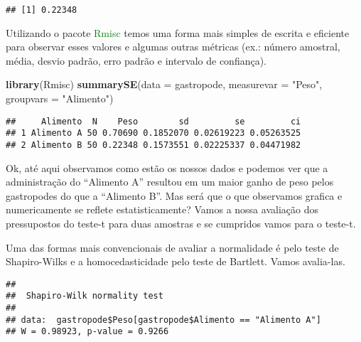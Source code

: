 \documentclass[titlepage, oneside, openany, a4paper]{book}
\newenvironment{Shaded}{\begin{snugshade}}{\end{snugshade}}
\newcommand{\DataTypeTok}[1]{\textcolor[rgb]{0.13,0.29,0.53}{#1}}
\newcommand{\KeywordTok}[1]{\textcolor[rgb]{0.13,0.29,0.53}{\textbf{#1}}}
\newcommand{\NormalTok}[1]{#1}
\newcommand{\OperatorTok}[1]{\textcolor[rgb]{0.81,0.36,0.00}{\textbf{#1}}}
\newcommand{\StringTok}[1]{\textcolor[rgb]{0.31,0.60,0.02}{#1}}
\begin{document}
\begin{verbatim}
## [1] 0.22348
\end{verbatim}

Utilizando o pacote \textcolor{green}{Rmisc} temos uma forma mais simples de escrita e eficiente para observar esses valores e algumas outras métricas (ex.: número amostral, média, desvio padrão, erro padrão e intervalo de confiança).

\begin{Shaded}
\begin{Highlighting}[]
\KeywordTok{library}\NormalTok{(Rmisc)}
\KeywordTok{summarySE}\NormalTok{(}\DataTypeTok{data =}\NormalTok{ gastropode, }\DataTypeTok{measurevar =} \StringTok{"Peso"}\NormalTok{, }\DataTypeTok{groupvars =} \StringTok{"Alimento"}\NormalTok{)}
\end{Highlighting}
\end{Shaded}

\begin{verbatim}
##     Alimento  N    Peso        sd         se         ci
## 1 Alimento A 50 0.70690 0.1852070 0.02619223 0.05263525
## 2 Alimento B 50 0.22348 0.1573551 0.02225337 0.04471982
\end{verbatim}

Ok, até aqui observamos como estão os nossos dados e podemos ver que a administração do ``Alimento A'' resultou em um maior ganho de peso pelos gastropodes do que a ``Alimento B''. Mas será que o que observamos grafica e numericamente se reflete estatisticamente? Vamos a nossa avaliação dos pressupostos do teste-t para duas amostras e se cumpridos vamos para o teste-t.

Uma das formas mais convencionais de avaliar a normalidade é pelo teste de Shapiro-Wilks e a homocedasticidade pelo teste de Bartlett. Vamos avalia-las.

\begin{Shaded}
\end{Shaded}

\begin{verbatim}
## 
##  Shapiro-Wilk normality test
## 
## data:  gastropode$Peso[gastropode$Alimento == "Alimento A"]
## W = 0.98923, p-value = 0.9266
\end{verbatim}
\end{document}
